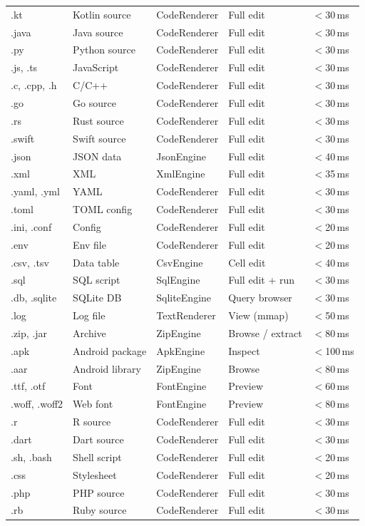 \documentclass[11pt, a4paper, openright]{report}
\begin{document}
\begin{longtable}{@{}p{18mm}p{38mm}p{32mm}p{22mm}p{28mm}@{}}
.kt & Kotlin source & CodeRenderer & Full edit & $<$30\,ms \\
.java & Java source & CodeRenderer & Full edit & $<$30\,ms \\
.py & Python source & CodeRenderer & Full edit & $<$30\,ms \\
.js, .ts & JavaScript & CodeRenderer & Full edit & $<$30\,ms \\
.c, .cpp, .h & C/C++ & CodeRenderer & Full edit & $<$30\,ms \\
.go & Go source & CodeRenderer & Full edit & $<$30\,ms \\
.rs & Rust source & CodeRenderer & Full edit & $<$30\,ms \\
.swift & Swift source & CodeRenderer & Full edit & $<$30\,ms \\
.json & JSON data & JsonEngine & Full edit & $<$40\,ms \\
.xml & XML & XmlEngine & Full edit & $<$35\,ms \\
.yaml, .yml & YAML & CodeRenderer & Full edit & $<$30\,ms \\
.toml & TOML config & CodeRenderer & Full edit & $<$30\,ms \\
.ini, .conf & Config & CodeRenderer & Full edit & $<$20\,ms \\
.env & Env file & CodeRenderer & Full edit & $<$20\,ms \\
.csv, .tsv & Data table & CsvEngine & Cell edit & $<$40\,ms \\
.sql & SQL script & SqlEngine & Full edit + run & $<$30\,ms \\
.db, .sqlite & SQLite DB & SqliteEngine & Query browser & $<$30\,ms \\
.log & Log file & TextRenderer & View (mmap) & $<$50\,ms \\
.zip, .jar & Archive & ZipEngine & Browse / extract & $<$80\,ms \\
.apk & Android package & ApkEngine & Inspect & $<$100\,ms \\
.aar & Android library & ZipEngine & Browse & $<$80\,ms \\
.ttf, .otf & Font & FontEngine & Preview & $<$60\,ms \\
.woff, .woff2 & Web font & FontEngine & Preview & $<$80\,ms \\
.r & R source & CodeRenderer & Full edit & $<$30\,ms \\
.dart & Dart source & CodeRenderer & Full edit & $<$30\,ms \\
.sh, .bash & Shell script & CodeRenderer & Full edit & $<$20\,ms \\
.css & Stylesheet & CodeRenderer & Full edit & $<$20\,ms \\
.php & PHP source & CodeRenderer & Full edit & $<$30\,ms \\
.rb & Ruby source & CodeRenderer & Full edit & $<$30\,ms \\
\bottomrule
\end{longtable}
\end{document}
